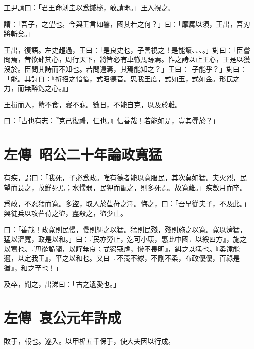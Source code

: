 工尹請曰：「君王命剝圭以爲鏚柲，敢請命。」王入視之。

謂：「吾子，之望也。今與王言如響，國其若之何？」曰：「摩厲以須，王出，吾刃將斬矣。」

王出，復語。左史趨過，王曰：「是良史也，子善視之！是能讀、、、。」對曰：「臣嘗問焉，昔欲肆其心，周行天下，將皆必有車轍馬跡焉。作之詩以止王心，王是以獲沒於。臣問其詩而不知也。若問遠焉，其焉能知之？」王曰：「子能乎？」對曰：「能。其詩曰：『祈招之愔愔，式昭德音。思我王度，式如玉，式如金。形民之力，而無醉飽之心。』」

王揖而入，饋不食，寢不寐。數日，不能自克，以及於難。

曰：「古也有志：『克己復禮，仁也。』信善哉！若能如是，豈其辱於？」

\section[子產論政寬猛\quad{\small 左傳 昭公二十年}]{{\normalsize 左傳\ 昭公二十年}\quad {}論政寬猛}
有疾，謂曰：「我死，子必爲政。唯有德者能以寬服民，其次莫如猛。夫火烈，民望而畏之，故鮮死焉；水懦弱，民狎而翫之，則多死焉。故寬難。」疾數月而卒。

爲政，不忍猛而寬。多盜，取人於萑苻之澤。悔之，曰：「吾早從夫子，不及此。」興徒兵以攻萑苻之盜，盡殺之，盜少止。

曰：「善哉！政寬則民慢，慢則糾之以猛。猛則民殘，殘則施之以寬。寬以濟猛，猛以濟寬，政是以和。」曰：『民亦勞止，汔可小康，惠此中國，以綏四方』，施之以寬也。『毋從詭隨，以謹無良；式遏寇虐，慘不畏明』，糾之以猛也。『柔遠能邇，以定我王』，平之以和也。又曰『不競不絿，不剛不柔，布政優優，百祿是遒』，和之至也！」

及卒，聞之，出涕曰：「古之遺愛也。」

\section[吳許越成\quad{\small 左傳 哀公元年}]{{\normalsize 左傳\ 哀公元年}\quad {}許成}
敗于，報也。遂入。以甲楯五千保于，使大夫因以行成。


